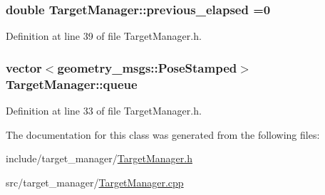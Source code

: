 \subsubsection[{\texorpdfstring{previous\+\_\+elapsed}{previous_elapsed}}]{\setlength{\rightskip}{0pt plus 5cm}double Target\+Manager\+::previous\+\_\+elapsed =0}\hypertarget{class_target_manager_a8260c1908c073454b41d350a5ce9e435}{}\label{class_target_manager_a8260c1908c073454b41d350a5ce9e435}


Definition at line 39 of file Target\+Manager.\+h.

\subsubsection[{\texorpdfstring{queue}{queue}}]{\setlength{\rightskip}{0pt plus 5cm}vector$<$geometry\+\_\+msgs\+::\+Pose\+Stamped$>$ Target\+Manager\+::queue}\hypertarget{class_target_manager_a0bbcb1981504e3bc587c3a98f41a91e9}{}\label{class_target_manager_a0bbcb1981504e3bc587c3a98f41a91e9}


Definition at line 33 of file Target\+Manager.\+h.



The documentation for this class was generated from the following files\+:\begin{DoxyCompactItemize}
\item 
include/target\+\_\+manager/\hyperlink{_target_manager_8h}{Target\+Manager.\+h}\item 
src/target\+\_\+manager/\hyperlink{_target_manager_8cpp}{Target\+Manager.\+cpp}\end{DoxyCompactItemize}
